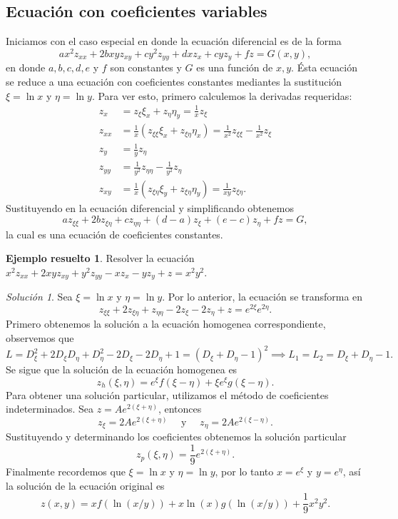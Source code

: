 \documentclass[11pt,letterpaper,draft]{report}
\theoremstyle{plain}
\theoremstyle{definition}
\newtheorem{solved}[theorem]{Ejemplo resuelto}
\theoremstyle{remark}
\newtheorem*{solution}{Solución}
\newcommand\<{\langle}
\renewcommand\>{\rangle}
\begin{document}
\subsection{Ecuación con coeficientes variables}

Iniciamos con el caso especial en donde la ecuación
diferencial es de la forma
\[
ax^2 z_{xx} + 2bxy z_{xy} + cy^2 z_{yy} + dx z_x + cy z_y +
fz = G(x,y),
\] 
en donde $a,b,c,d,e$ y $f$ son constantes y $G$ es una
función de $x,y$. Ésta ecuación se reduce a una ecuación con
coeficientes constantes mediantes la sustitución $\xi = \ln
x$ y $\eta = \ln y$. Para ver esto, primero calculemos la
derivadas requeridas:
\begin{align*}
  z_x &= z_\xi \xi_x + z_\eta \eta_y = \frac{1}{x} z_\xi\\
  z_{xx} &= \frac{1}{x}\left(z_{\xi\xi} \xi_x + z_{\xi\eta}
    \eta_x\right) = \frac{1}{x^2} z_{\xi\xi} -
    \frac{1}{x^2}z_\xi\\
    z_y &= \frac{1}{y}z_\eta\\
    z_{yy} &= \frac{1}{y^2}z_{\eta\eta} -
    \frac{1}{y^2}z_\eta\\
    z_{xy} &= \frac{1}{x}\left(z_{\xi\eta} \xi_y +
      z_{\xi\eta} \eta_y\right) = \frac{1}{xy}z_{\xi\eta}.
\end{align*}
Sustituyendo en la ecuación diferencial y simplificando
obtenemos
\[
a z_{\xi\xi} + 2bz_{\xi\eta} + cz_{\eta\eta} + (d-a)z_\xi +
(e-c)z_\eta + fz = G,
\] 
la cual es una ecuación de coeficientes constantes.

\begin{solved}
  Resolver la ecuación $x^2z_{xx} + 2xyz_{xy} +
  y^2z_{yy}-xz_x-yz_y + z = x^2y^2$.
  \begin{solution}
    Sea $\xi = \ln x$ y $\eta = \ln y$. Por lo anterior, la
    ecuación se transforma en
    \[
    z_{\xi\xi} + 2z_{\xi\eta} + z_{\eta\eta} - 2z_{\xi} -
    2z_\eta + z = e^{2\xi}e^{2\eta}.
    \] 
    Primero obtenemos la solución a la ecuación homogenea
    correspondiente, observemos que
    \[
    L = D_\xi^2 + 2D_\xi D_\eta + D_\eta^2 - 2D_\xi - 2D_\eta
    + 1 = (D_\xi + D_\eta-1)^2 \implies L_1 = L_2 = D_\xi +
    D_\eta - 1.
    \] 
    Se sigue que la solución de la ecuación homogenea es
    \[
    z_h(\xi,\eta) = e^{\xi}f(\xi-\eta) + \xi
    e^{\xi}g(\xi-\eta).
    \] 
    Para obtener una solución particular, utilizamos el
    método de coeficientes indeterminados. Sea $z =
    Ae^{2(\xi+\eta)}$, entonces
    \[
    z_\xi = 2Ae^{2(\xi+\eta)} \quad \text{ y } \quad z_\eta
    = 2Ae^{2(\xi-\eta)}.
    \] 
    Sustituyendo y determinando los coeficientes obtenemos
    la solución particular
    \[
    z_p(\xi,\eta) = \frac{1}{9}e^{2(\xi+\eta)}.
    \] 
    Finalmente recordemos que $\xi = \ln x$ y $\eta = \ln
    y$, por lo tanto $x = e^{\xi}$ y $y = e^{\eta}$, así la
    solución de la ecuación original es
    \[
    z(x,y) = xf(\ln(x / y)) + x\ln(x)g(\ln(x / y)) +
    \frac{1}{9}x^2y^2.
    \] 
  \end{solution}
\end{solved}
\end{document}
